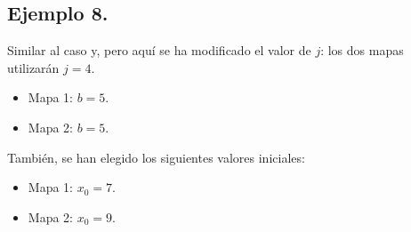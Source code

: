 \documentclass[10pt]{IEEEtran}
\begin{document}
\subsection{Ejemplo 8.}
Similar al caso y, pero aquí se ha modificado el valor de $j$: los dos mapas utilizarán $j=4$. 

\begin{itemize}
\item Mapa 1: $b =  5$.
\item Mapa 2: $b =  5$.
\end{itemize}

También, se han elegido los siguientes valores iniciales:

\begin{itemize}
\item Mapa 1: $x_{0} = 7$.
\item Mapa 2: $x_{0} = 9$.
\end{itemize}
\end{document}
